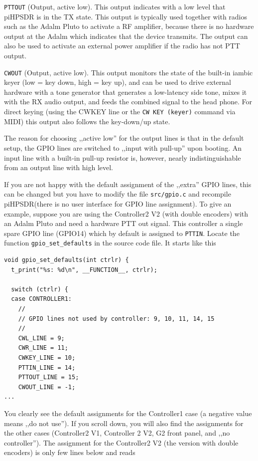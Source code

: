 \documentclass[12pt]{book}
\def\rett#1{\texttt{\color{red}#1}}
\def\bltt#1{\texttt{\color{blue}#1}}
\def\pH{pi\-HPSDR\xspace}
\begin{document}
\rett{PTTOUT} (Output, active low). This output indicates with a low level that \pH is in the
TX state. This output is typically used together with radios such as the Adalm Pluto to activate
a RF amplifier, because there is no hardware output at the Adalm which indicates that the device
transmits. The output can also be used to activate an external power amplifier if the radio has
not PTT output.

\rett{CWOUT} (Output, active low). This output monitors the state of the built-in iambic keyer
(low = key down, high = key up), and can be used to drive external hardware with a tone generator
that generates a low-latency side tone, mixes it with the RX audio output, and feeds the combined
signal to the head phone. For direct keying (using the CWKEY line or the \bltt{CW KEY (keyer)}
command via MIDI) this output also
follows the key-down/up state.

The reason for choosing ,,active low'' for the output lines is that in the default setup,
the GPIO lines are switched
to ,,input with pull-up'' upon booting. An input line with a built-in pull-up
resistor is, however,
nearly indistinguishable from an output line with high level.

If you are not happy with the default assignment of the ,,extra'' GPIO lines, this can be changed
but you have to modify the file \texttt{src/gpio.c} and recompile \pH (there is no user interface
for GPIO line assignment). To give an example, suppose you are using the Controller2 V2 (with double
encoders) with an Adalm Pluto and need a hardware PTT out signal. This controller a single spare GPIO line
(GPIO14) which by default is assigned to \rett{PTTIN}. Locate the function \texttt{gpio\_set\_defaults}
in the source code file. It starts like this

\begin{small}
\begin{verbatim}
void gpio_set_defaults(int ctrlr) {
  t_print("%s: %d\n", __FUNCTION__, ctrlr);

  switch (ctrlr) {
  case CONTROLLER1:
    //
    // GPIO lines not used by controller: 9, 10, 11, 14, 15
    //
    CWL_LINE = 9;
    CWR_LINE = 11;
    CWKEY_LINE = 10;
    PTTIN_LINE = 14;
    PTTOUT_LINE = 15;
    CWOUT_LINE = -1;
...
\end{verbatim}
\end{small}

You clearly see the default assignments for the Controller1 case (a negative value means ,,do not use'').
If you scroll down, you will also find the assignments for the other cases (Controller2 V1, Controller 2 V2,
G2 front panel, and ,,no controller''). The assignment for the Controller2 V2 (the version with double
encoders) is only few lines below and reads
\end{document}
